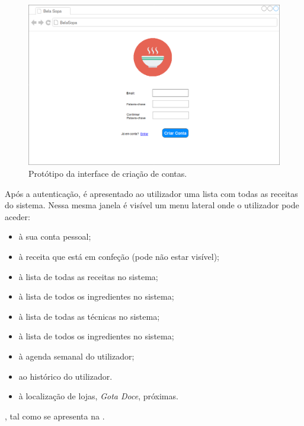 \begin{figure}[H]
  \centering 
  \includegraphics[width = \textwidth]{figures/07/Registar.png}
  \caption{Protótipo da interface de criação de contas.}
  \label{fig:interface:registar}
\end{figure}

Após a autenticação, é apresentado ao utilizador uma lista com todas as receitas do sistema. Nessa mesma janela é visível um menu lateral onde o utilizador pode aceder:
\begin{itemize}
    \item à sua conta pessoal;
    \item à receita que está em confeção (pode não estar visível);
    \item à lista de todas as receitas no sistema;
    \item à lista de todos os ingredientes no sistema;
    \item à lista de todas as técnicas no sistema;
    \item à lista de todos os ingredientes no sistema;
    \item à agenda semanal do utilizador;
    \item ao histórico do utilizador.
    \item à localização de lojas, \emph{Gota Doce}, próximas.
\end{itemize}
, tal como se apresenta na .

